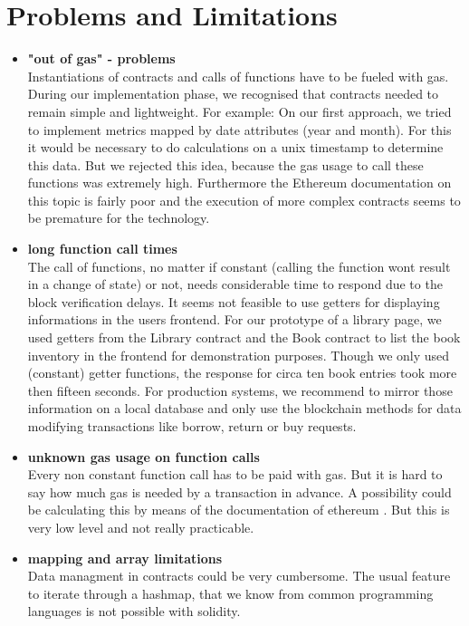\section{Problems and Limitations}
\begin{itemize}
\item \textbf{"out of gas" - problems}\\
Instantiations of contracts and calls of functions have to be fueled with gas. During our implementation phase, we recognised that contracts needed to remain simple and lightweight. 
For example: On our first approach, we tried to implement metrics mapped by date attributes (year and month). For this it would be necessary to do calculations on a unix timestamp to determine this data.
But we rejected this idea, because the gas usage to call these functions was extremely high. Furthermore the Ethereum documentation on this topic is fairly poor and the execution of more complex contracts seems to be premature for the technology.

\item \textbf{long function call times}\\
The call of functions, no matter if constant (calling the function wont result in a change of state) or not, needs considerable time to respond due to the block verification delays. It seems not feasible to use getters for displaying informations in the users frontend.
For our prototype of a library page, we used getters from the Library contract and the Book contract to list the book inventory in the frontend for demonstration purposes. Though we only used (constant) getter functions, the response for circa ten book entries took more then fifteen seconds. For production systems, we recommend to mirror those information on a local database and only use the blockchain methods for data modifying transactions like borrow, return or buy requests.

\item \textbf{unknown gas usage on function calls}\\
Every non constant function call has to be paid with gas. But it is hard to say how much gas is needed by a transaction in advance. A possibility could be calculating this by means of the documentation of ethereum \cite{wood2014ethereum}. But this is very low level and not really practicable. 

\item \textbf{mapping and array limitations}\\
Data managment in contracts could be very cumbersome. The usual feature to iterate through a hashmap, that we know from common programming languages is not possible with solidity.


\end{itemize}

